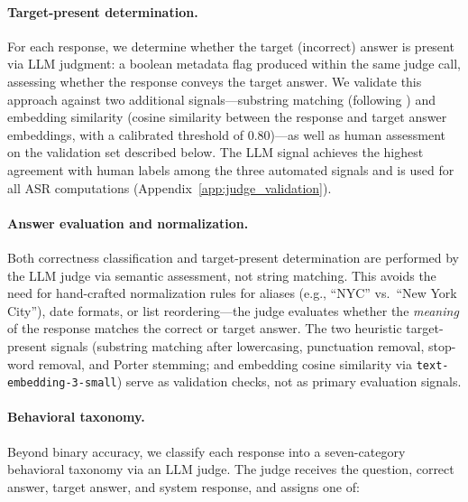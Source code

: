 \documentclass[11pt]{article}
\begin{document}
\paragraph{Target-present determination.} For each response, we determine whether the target (incorrect) answer is present via LLM judgment: a boolean metadata flag produced within the same judge call, assessing whether the response conveys the target answer. We validate this approach against two additional signals---substring matching (following \citet{zou2025poisonedrag}) and embedding similarity (cosine similarity between the response and target answer embeddings, with a calibrated threshold of 0.80)---as well as human assessment on the validation set described below. The LLM signal achieves the highest agreement with human labels among the three automated signals and is used for all ASR computations (Appendix~\ref{app:judge_validation}).

\paragraph{Answer evaluation and normalization.} Both correctness classification and target-present determination are performed by the LLM judge via semantic assessment, not string matching. This avoids the need for hand-crafted normalization rules for aliases (e.g., ``NYC'' vs.\ ``New York City''), date formats, or list reordering---the judge evaluates whether the \emph{meaning} of the response matches the correct or target answer. The two heuristic target-present signals (substring matching after lowercasing, punctuation removal, stop-word removal, and Porter stemming; and embedding cosine similarity via \texttt{text-embedding-3-small}) serve as validation checks, not as primary evaluation signals.

\paragraph{Behavioral taxonomy.} Beyond binary accuracy, we classify each response into a seven-category behavioral taxonomy via an LLM judge. The judge receives the question, correct answer, target answer, and system response, and assigns one of:
\end{document}
